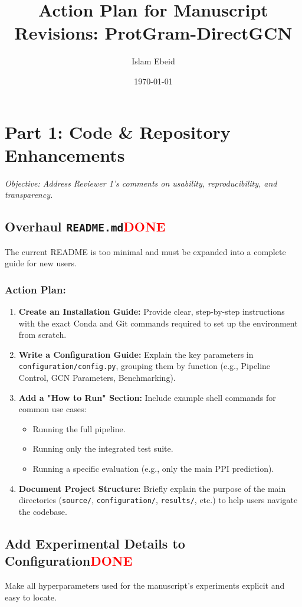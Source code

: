 \documentclass[11pt, a4paper]{article}
\title{Action Plan for Manuscript Revisions: ProtGram-DirectGCN}
\author{Islam Ebeid}
\date{\today}
\begin{document}
	
	\maketitle

	
	\section{Part 1: Code \& Repository Enhancements}
	\textit{Objective: Address Reviewer 1's comments on usability, reproducibility, and transparency.}
	
	\subsection{Overhaul \texttt{README.md}\textcolor{red}{DONE}}
	The current README is too minimal and must be expanded into a complete guide for new users.
	\subsubsection*{Action Plan:}
	\begin{enumerate}
		\item \textbf{Create an Installation Guide:} Provide clear, step-by-step instructions with the exact Conda and Git commands required to set up the environment from scratch.
		\item \textbf{Write a Configuration Guide:} Explain the key parameters in \texttt{configuration/config.py}, grouping them by function (e.g., Pipeline Control, GCN Parameters, Benchmarking).
		\item \textbf{Add a "How to Run" Section:} Include example shell commands for common use cases:
		\begin{itemize}
			\item Running the full pipeline.
			\item Running only the integrated test suite.
			\item Running a specific evaluation (e.g., only the main PPI prediction).
		\end{itemize}
		\item \textbf{Document Project Structure:} Briefly explain the purpose of the main directories (\texttt{source/}, \texttt{configuration/}, \texttt{results/}, etc.) to help users navigate the codebase.
	\end{enumerate}
	
	\subsection{Add Experimental Details to Configuration\textcolor{red}{DONE}}
	Make all hyperparameters used for the manuscript's experiments explicit and easy to locate.
\end{document}
